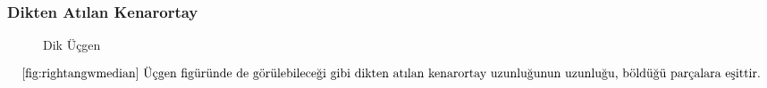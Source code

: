 \subsubsection{Dikten Atılan Kenarortay}
\begin{figure}[h!]
    \centering
    \caption{Dik Üçgen}
    \label{fig:rightangwmedian}
\end{figure}

\begin{equation}
    \text{\ref{fig:rightangwmedian} Üçgen figüründe de görülebileceği gibi dikten atılan kenarortay uzunluğunun uzunluğu, böldüğü parçalara eşittir.}
\end{equation}